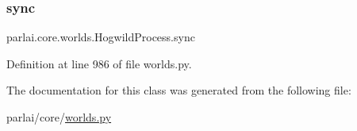 \subsubsection{\texorpdfstring{sync}{sync}}
{\footnotesize\ttfamily parlai.\+core.\+worlds.\+Hogwild\+Process.\+sync}



Definition at line 986 of file worlds.\+py.



The documentation for this class was generated from the following file\+:\begin{DoxyCompactItemize}
\item 
parlai/core/\hyperlink{parlai_2core_2worlds_8py}{worlds.\+py}\end{DoxyCompactItemize}
